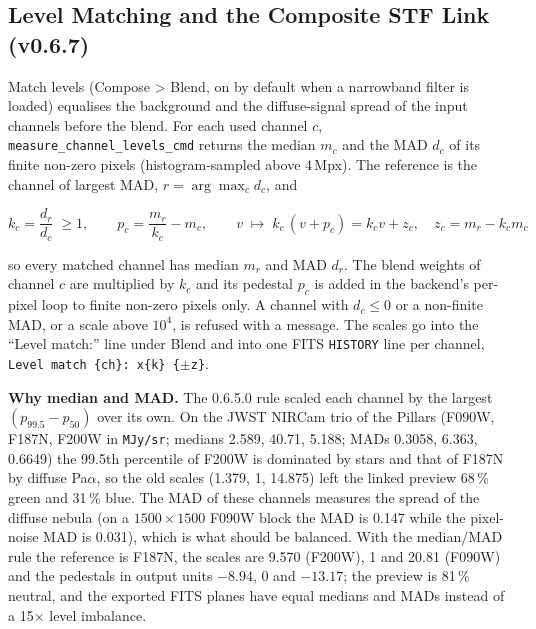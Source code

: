 \documentclass[11pt,a4paper]{article}
\newcommand{\code}[1]{\texttt{\small #1}}
\begin{document}
    \subsection{Level Matching and the Composite STF Link (v0.6.7)}
    \label{sec:levels_math}

    Match levels (Compose \textgreater{} Blend, on by default when a narrowband filter is loaded) equalises the background and the diffuse-signal spread of the input channels before the blend. For each used channel $c$, \code{measure\_channel\_levels\_cmd} returns the median $m_c$ and the MAD $d_c$ of its finite non-zero pixels (histogram-sampled above 4\,Mpx). The reference is the channel of largest MAD, $r = \arg\max_c d_c$, and

    \begin{equation}
        \boxed{
            k_c = \frac{d_r}{d_c} \;\ge 1, \qquad
            p_c = \frac{m_r}{k_c} - m_c, \qquad
            v \;\mapsto\; k_c\,(v + p_c) = k_c v + z_c, \quad z_c = m_r - k_c m_c
        }
    \end{equation}

    so every matched channel has median $m_r$ and MAD $d_r$. The blend weights of channel $c$ are multiplied by $k_c$ and its pedestal $p_c$ is added in the backend's per-pixel loop to finite non-zero pixels only. A channel with $d_c \le 0$ or a non-finite MAD, or a scale above $10^4$, is refused with a message. The scales go into the ``Level match:'' line under Blend and into one FITS \code{HISTORY} line per channel, \code{Level match \{ch\}: x\{k\} \{$\pm$z\}}.

    \textbf{Why median and MAD.} The 0.6.5.0 rule scaled each channel by the largest $(p_{99.5} - p_{50})$ over its own. On the JWST NIRCam trio of the Pillars (F090W, F187N, F200W in \code{MJy/sr}; medians 2.589, 40.71, 5.188; MADs 0.3058, 6.363, 0.6649) the 99.5th percentile of F200W is dominated by stars and that of F187N by diffuse Pa$\alpha$, so the old scales (1.379, 1, 14.875) left the linked preview 68\,\% green and 31\,\% blue. The MAD of these channels measures the spread of the diffuse nebula (on a $1500 \times 1500$ F090W block the MAD is 0.147 while the pixel-noise MAD is 0.031), which is what should be balanced. With the median/MAD rule the reference is F187N, the scales are 9.570 (F200W), 1 and 20.81 (F090W) and the pedestals in output units $-8.94$, 0 and $-13.17$; the preview is 81\,\% neutral, and the exported FITS planes have equal medians and MADs instead of a 15$\times$ level imbalance.
\end{document}

